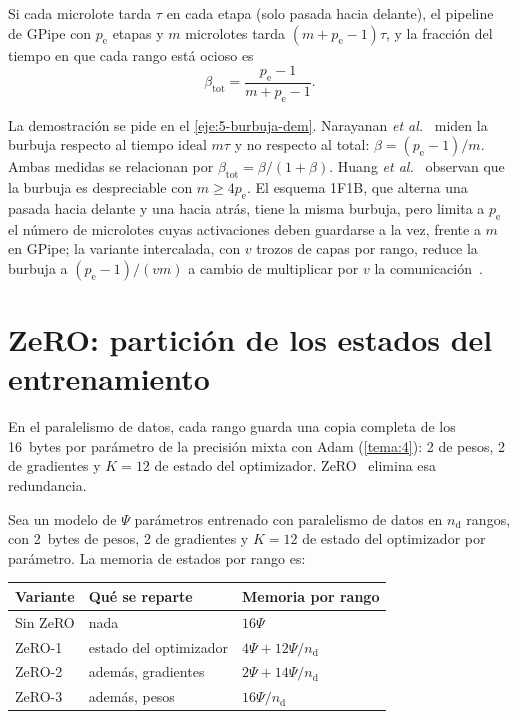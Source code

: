 \begin{proposicion}\label{prop:burbuja}
Si cada microlote tarda $\tau$ en cada etapa (solo pasada hacia delante), el pipeline de GPipe con $p_{\mathrm{e}}$ etapas y $m$ microlotes tarda $(m+p_{\mathrm{e}}-1)\tau$, y la fracción del tiempo en que cada rango está ocioso es
\[
\beta_{\mathrm{tot}}=\frac{p_{\mathrm{e}}-1}{m+p_{\mathrm{e}}-1}.
\]
\end{proposicion}

La demostración se pide en el \cref{eje:5-burbuja-dem}. Narayanan \emph{et al.}~\cite[§2.2.1]{narayanan} miden la burbuja respecto al tiempo ideal $m\tau$ y no respecto al total: $\beta=(p_{\mathrm{e}}-1)/m$. Ambas medidas se relacionan por $\beta_{\mathrm{tot}}=\beta/(1+\beta)$. Huang \emph{et al.}~\cite[§2.3]{gpipe} observan que la burbuja es despreciable con $m\ge 4p_{\mathrm{e}}$. El esquema 1F1B, que alterna una pasada hacia delante y una hacia atrás, tiene la misma burbuja, pero limita a $p_{\mathrm{e}}$ el número de microlotes cuyas activaciones deben guardarse a la vez, frente a $m$ en GPipe; la variante intercalada, con $v$ trozos de capas por rango, reduce la burbuja a $(p_{\mathrm{e}}-1)/(vm)$ a cambio de multiplicar por $v$ la comunicación~\cite[§2.2.2]{narayanan}.

\section{ZeRO: partición de los estados del entrenamiento}

En el paralelismo de datos, cada rango guarda una copia completa de los 16~bytes por parámetro de la precisión mixta con Adam (\cref{tema:4}): 2 de pesos, 2 de gradientes y $K=12$ de estado del optimizador. ZeRO~\cite{zero} elimina esa redundancia.

\begin{proposicion}\label{prop:zero}
Sea un modelo de $\Psi$ parámetros entrenado con paralelismo de datos en $n_{\mathrm{d}}$ rangos, con 2~bytes de pesos, 2 de gradientes y $K=12$ de estado del optimizador por parámetro. La memoria de estados por rango es:
\begin{center}\small
\begin{tabular}{@{}lll@{}}
\toprule
Variante & Qué se reparte & Memoria por rango \\
\midrule
Sin ZeRO & nada & $16\Psi$ \\
ZeRO-1 & estado del optimizador & $4\Psi+12\Psi/n_{\mathrm{d}}$ \\
ZeRO-2 & además, gradientes & $2\Psi+14\Psi/n_{\mathrm{d}}$ \\
ZeRO-3 & además, pesos & $16\Psi/n_{\mathrm{d}}$ \\
\bottomrule
\end{tabular}
\end{center}
\end{proposicion}

